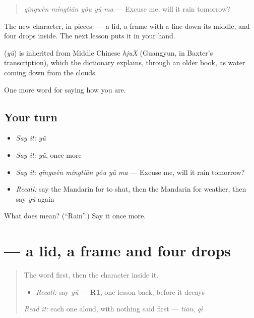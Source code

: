 \begin{quote}
\textbf{} \emph{qǐngwèn míngtiān yǒu yǔ ma} — Excuse me, will it rain tomorrow?
\end{quote}

The new character, in pieces:  — a lid, a frame with a line down its middle, and four drops inside. The next lesson puts it in your hand.

\begin{cousinweb}
\textbf{} (\emph{yǔ}) is inherited from Middle Chinese \emph{hjuX} (Guangyun, in Baxter's transcription), which the dictionary explains, through an older book, as water coming down from the clouds.
\end{cousinweb}

\begin{grammarlens}[title={What you've built}]
One more word for saying how you are.
\end{grammarlens}

\subsection*{Your turn}
\begin{itemize}
\raggedright
  \item \emph{Say it:} \emph{yǔ}
  \item \emph{Say it:} \emph{yǔ}, once more
  \item \emph{Say it:} \emph{qǐngwèn míngtiān yǒu yǔ ma} — Excuse me, will it rain tomorrow?
  \item \emph{Recall:} say the Mandarin for to shut, then the Mandarin for weather, then say \emph{yǔ} again
\end{itemize}

\begin{tcolorbox}[breakable,colback=teal!4,colframe=teal!35!black,title={Before you move on}]
What does  mean? (\textquotedblleft{}Rain\textquotedblright{}.) Say it once more.
\end{tcolorbox}
\section[\texorpdfstring{\zh{雨} (yǔ)}{雨 (yǔ)}]{ — a lid, a frame and four drops}

\label{lesson:ZH-W66-yu-rain}



\begin{quote}
The word first, then the character inside it.

\begin{itemize}
\raggedright
  \item \emph{Recall:} say \emph{yǔ} — \textbf{R1}, one lesson back, before it decays
\end{itemize}

\begin{quote}
 
\end{quote}

\emph{Read it:} each one aloud, with nothing said first — \emph{tiān}, \emph{qì}
\end{quote}


